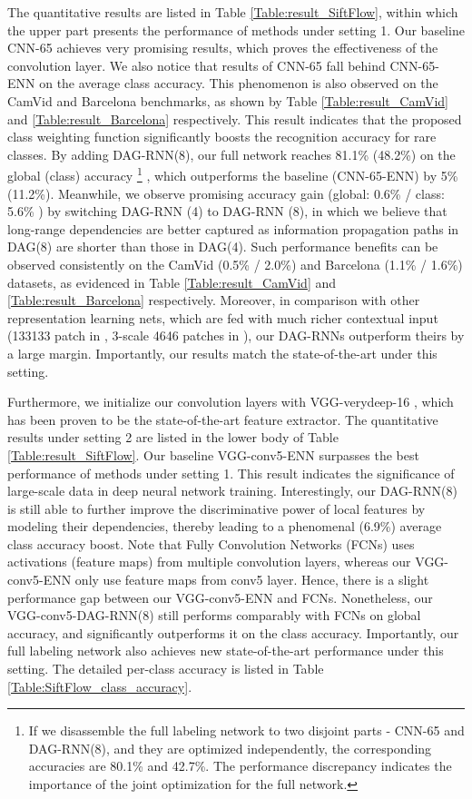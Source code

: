 \documentclass[10pt,twocolumn,letterpaper]{article}
\begin{document}
The quantitative results are listed in Table \ref{Table:result_SiftFlow}, within which the upper part presents the performance of methods under setting 1.
Our baseline CNN-65 achieves very promising results, which proves the effectiveness of the convolution layer. We also notice that results of CNN-65 fall behind CNN-65-ENN on the average class accuracy. This phenomenon is also observed on the CamVid and Barcelona benchmarks, as shown by Table \ref{Table:result_CamVid} and \ref{Table:result_Barcelona} respectively.
This result indicates that the proposed class weighting function significantly boosts the recognition accuracy for rare classes.
By adding DAG-RNN(8), our full network reaches 81.1\% (48.2\%) on the global (class) accuracy
\footnote{If we disassemble the full labeling network to two disjoint parts - CNN-65 and DAG-RNN(8), and they are optimized independently, the corresponding accuracies are 80.1\% and 42.7\%. The performance discrepancy indicates the importance of the joint optimization for the full network.}
, which outperforms the baseline (CNN-65-ENN) by 5\% (11.2\%). Meanwhile, we observe promising accuracy gain (global: 0.6\% / class: 5.6\% ) by switching DAG-RNN (4) to DAG-RNN (8), in which we believe that long-range dependencies are better captured as information propagation paths in DAG(8) are shorter than those in DAG(4). Such performance benefits can be observed consistently on the CamVid (0.5\% / 2.0\%) and Barcelona (1.1\% / 1.6\%) datasets, as evidenced in Table \ref{Table:result_CamVid} and \ref{Table:result_Barcelona} respectively. Moreover, in comparison with other representation learning nets, which are fed with much richer contextual input (133133 patch in \cite{pinheiro2014recurrent}, 3-scale 4646 patches in \cite{farabet2013learning}), our DAG-RNNs outperform theirs by a large margin.  Importantly, our results match the state-of-the-art under this setting.

Furthermore, we initialize our convolution layers with VGG-verydeep-16 \cite{simonyan2014very}, which has been proven to be the state-of-the-art feature extractor. The quantitative results under setting 2 are listed in the lower body of Table \ref{Table:result_SiftFlow}. Our baseline VGG-conv5-ENN surpasses the best performance of methods under setting 1. This result indicates the significance of large-scale data in deep neural network training. Interestingly, our DAG-RNN(8) is still able to further improve the discriminative power of local features by modeling their dependencies, thereby leading to a phenomenal (6.9\%) average class accuracy boost. Note that Fully Convolution Networks (FCNs) \cite{long2015fully} uses activations (feature maps) from multiple convolution layers, whereas our VGG-conv5-ENN only use feature maps from conv5 layer. Hence, there is a slight performance gap between our VGG-conv5-ENN and FCNs. Nonetheless, our VGG-conv5-DAG-RNN(8) still performs comparably with FCNs on global accuracy, and significantly outperforms it on the class accuracy. Importantly, our full labeling network also achieves new state-of-the-art performance under this setting. The detailed per-class accuracy is listed in Table \ref{Table:SiftFlow_class_accuracy}.
\end{document}
